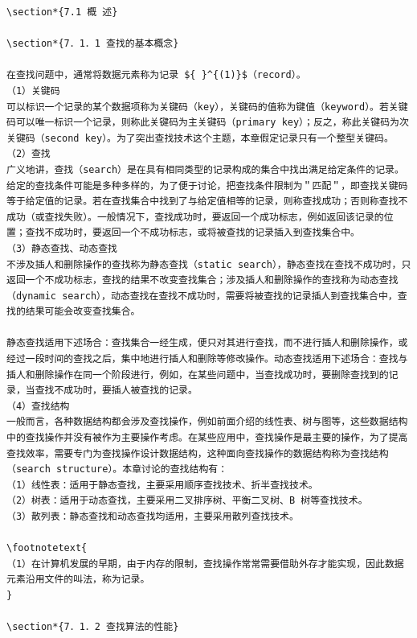 \documentclass[10pt]{article}
\let\svthefootnote\thefootnote
\newcommand\blfootnotetext[1]{%
  \let\thefootnote\relax\footnote{#1}%
  \addtocounter{footnote}{-1}%
  \let\thefootnote\svthefootnote%
}
\let\svfootnotetext\footnotetext
\renewcommand\footnotetext[2][?]{%
  \if\relax#1\relax%
    \ifnum\value{footnote}=0\blfootnotetext{#2}\else\svfootnotetext{#2}\fi%
  \else%
    \if?#1\ifnum\value{footnote}=0\blfootnotetext{#2}\else\svfootnotetext{#2}\fi%
    \else\svfootnotetext[#1]{#2}\fi%
  \fi
}
\begin{document}
\begin{verbatim}
\section*{7.1 概 述}

\section*{7．1．1 查找的基本概念}

在查找问题中，通常将数据元素称为记录 ${ }^{(1)}$（record）。
（1）关键码
可以标识一个记录的某个数据项称为关键码（key），关键码的值称为键值（keyword）。若关键码可以唯一标识一个记录，则称此关键码为主关键码（primary key）；反之，称此关键码为次关键码（second key）。为了突出查找技术这个主题，本章假定记录只有一个整型关键码。
（2）查找
广义地讲，查找（search）是在具有相同类型的记录构成的集合中找出满足给定条件的记录。给定的查找条件可能是多种多样的，为了便于讨论，把查找条件限制为＂匹配＂，即查找关键码等于给定值的记录。若在查找集合中找到了与给定值相等的记录，则称查找成功；否则称查找不成功（或查找失败）。一般情况下，查找成功时，要返回一个成功标志，例如返回该记录的位置；查找不成功时，要返回一个不成功标志，或将被查找的记录插入到查找集合中。
（3）静态查找、动态查找
不涉及插人和删除操作的查找称为静态查找（static search），静态查找在查找不成功时，只返回一个不成功标志，查找的结果不改变查找集合；涉及插人和删除操作的查找称为动态查找（dynamic search），动态查找在查找不成功时，需要将被查找的记录插人到查找集合中，查找的结果可能会改变查找集合。

静态查找适用下述场合：查找集合一经生成，便只对其进行查找，而不进行插人和删除操作，或经过一段时间的查找之后，集中地进行插人和删除等修改操作。动态查找适用下述场合：查找与插人和删除操作在同一个阶段进行，例如，在某些问题中，当查找成功时，要删除查找到的记录，当查找不成功时，要插人被查找的记录。
（4）查找结构
一般而言，各种数据结构都会涉及查找操作，例如前面介绍的线性表、树与图等，这些数据结构中的查找操作并没有被作为主要操作考虑。在某些应用中，查找操作是最主要的操作，为了提高查找效率，需要专门为查找操作设计数据结构，这种面向查找操作的数据结构称为查找结构（search structure）。本章讨论的查找结构有：
（1）线性表：适用于静态查找，主要采用顺序查找技术、折半查找技术。
（2）树表：适用于动态查找，主要采用二叉排序树、平衡二叉树、B 树等查找技术。
（3）散列表：静态查找和动态查找均适用，主要采用散列查找技术。

\footnotetext{
（1）在计算机发展的早期，由于内存的限制，查找操作常常需要借助外存才能实现，因此数据元素沿用文件的叫法，称为记录。
}

\section*{7．1．2 查找算法的性能}


\end{verbatim}
\end{document}
